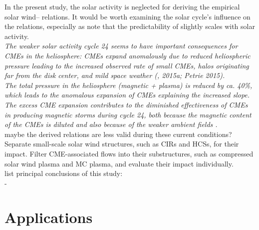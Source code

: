 
In the present study, the solar activity is neglected for deriving the empirical solar wind--\Kp{} relations. It would be worth examining the solar cycle's influence on the relations, especially as \citet{Wing2005} note that the predictability of \Kp{} slightly scales with solar activity.\\

\textit{The weaker solar activity cycle 24 seems to have important consequences for CMEs in the heliosphere: CMEs expand anomalously due to reduced heliospheric pressure leading to the increased observed rate of small CMEs, halos originating far from the disk center, and mild space weather (\citep{Gopalswamy2014}, 2015a; Petrie 2015).\\
The total pressure in the heliosphere (magnetic + plasma) is reduced by ca. 40\%, which leads to the anomalous expansion of CMEs explaining the increased slope. The excess CME expansion contributes to the diminished effectiveness of CMEs in producing magnetic storms during cycle 24, both because the magnetic content of the CMEs is diluted and also because of the weaker ambient fields \citep{Gopalswamy2014}.\\
}
maybe the derived relations are less valid during these current conditions?\\

Separate small-scale solar wind structures, such as CIRs and HCSs, for their \Kp{} impact. Filter CME-associated flows into their substructures, such as compressed solar wind plasma and MC plasma, and evaluate their \Kp{} impact individually.\\


list principal conclusions of this study:\\
- \\


\section{Applications}

